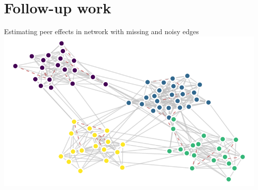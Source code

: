 \documentclass[aspectratio=169]{beamer}
\theoremstyle{remark}
\begin{document}


\section{Follow-up work}

\begin{frame}{Estimating peer effects in network with missing and noisy edges}
    \centering
    \includegraphics{./figures/missing-edges.pdf}
\end{frame}
\end{document}
